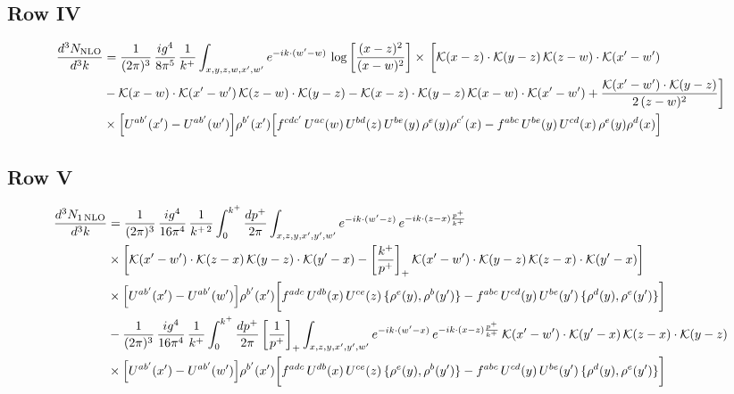 \documentclass[9pt]{article}
\numberwithin{equation}{section}
\begin{document}
\subsection{Row IV}
\begin{align}
\frac{d^{3}N_{\rm NLO}}{d^{3}k} & = \frac{1}{(2\pi)^{3}}\,\frac{ig^{4}}{8\pi^{5}}\,\frac{1}{k^{+}}\int_{x,y,z,w,x',w'}e^{-ik\cdot(w'-w)}\,\log\left[\frac{(x-z)^{2}}{(x-w)^{2}}\right]\times\,\bigg[\mathcal{K}(x-z)\cdot\mathcal{K}(y-z)\,\mathcal{K}(z-w)\cdot\mathcal{K}(x'-w')\notag \\ & -\mathcal{K}(x-w)\cdot\mathcal{K}(x'-w')\,\mathcal{K}(z-w)\cdot\mathcal{K}(y-z)-\mathcal{K}(x-z)\cdot\mathcal{K}(y-z)\,\mathcal{K}(x-w)\cdot\mathcal{K}(x'-w')+\frac{\mathcal{K}(x'-w')\cdot\mathcal{K}(y-z)}{2\,(z-w)^{2}}\bigg]\notag \\ & \times\Big[U^{ab'}(x')-U^{ab'}(w')\Big]\rho^{b'}(x')\Big[f^{cdc'}\,U^{ac}(w)\,U^{bd}(z)\,U^{be}(y)\,\rho^{e}(y)\rho^{c'}(x)-f^{abc}\,U^{be}(y)\,U^{cd}(x)\,\rho^{e}(y)\rho^{d}(x)\Big]
\end{align}
\subsection{Row V}
\begin{align}
\frac{d^{3}N_{1\,\rm NLO}}{d^{3}k} & =\frac{1}{(2\pi)^{3}}\,\frac{ig^{4}}{16\pi^{4}}\,\frac{1}{k^{+\,2}}\int_{0}^{k^{+}}\frac{dp^{+}}{2\pi}\int_{x,z,y,x',y',w'}e^{-ik\cdot(w'-z)}\,e^{-ik\cdot(z-x)\frac{p^{+}}{k^{+}}}\notag\\
&\times\bigg[\mathcal{K}(x'-w')\cdot\mathcal{K}(z-x)\,\mathcal{K}(y-z)\cdot\mathcal{K}(y'-x)-\left[\frac{k^{+}}{p^{+}}\right]_{+}\mathcal{K}(x'-w')\cdot\mathcal{K}(y-z)\,\mathcal{K}(z-x)\cdot\mathcal{K}(y'-x)\bigg]\notag\\
&\times\Big[U^{ab'}(x')-U^{ab'}(w')\Big]\rho^{b'}(x')\bigg[f^{adc}\,U^{db}(x)\,U^{ce}(z)\,\{\rho^{e}(y),\rho^{b}(y')\}-f^{abc}\,U^{cd}(y)\,U^{be}(y')\,\{\rho^{d}(y),\rho^{e}(y')\}\bigg]\notag\\
&-\frac{1}{(2\pi)^{3}}\,\frac{ig^{4}}{16\pi^{4}}\,\frac{1}{k^{+}}\int_{0}^{k^{+}}\frac{dp^{+}}{2\pi}\left[\frac{1}{p^{+}}\right]_{+}\int_{x,z,y,x',y',w'}e^{-ik\cdot(w'-x)}\,e^{-ik\cdot(x-z)\frac{p^{+}}{k^{+}}}\,\mathcal{K}(x'-w')\cdot\mathcal{K}(y'-x)\,\mathcal{K}(z-x)\cdot\mathcal{K}(y-z)\notag\\
&\times\Big[U^{ab'}(x')-U^{ab'}(w')\Big]\rho^{b'}(x')\bigg[f^{adc}\,U^{db}(x)\,U^{ce}(z)\,\{\rho^{e}(y),\rho^{b}(y')\}-f^{abc}\,U^{cd}(y)\,U^{be}(y')\,\{\rho^{d}(y),\rho^{e}(y')\}\bigg]
\end{align}
\end{document}
